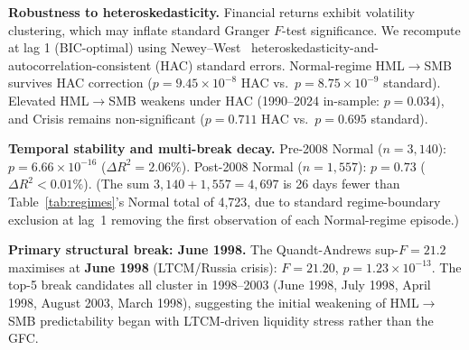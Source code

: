 \documentclass[sigconf,anonymous]{acmart}
\begin{document}
\textbf{Robustness to heteroskedasticity.}
Financial returns exhibit volatility clustering, which may inflate standard Granger
$F$-test significance. We recompute at lag 1 (BIC-optimal) using Newey--West~\cite{newey1987simple}
heteroskedasticity-and-autocorrelation-consistent (HAC) standard errors.
Normal-regime HML$\to$SMB survives HAC correction
($p = 9.45 \times 10^{-8}$ HAC vs.\ $p = 8.75 \times 10^{-9}$ standard).
Elevated HML$\to$SMB weakens under HAC (1990--2024 in-sample: $p = 0.034$), and Crisis remains
non-significant ($p = 0.711$ HAC vs.\ $p = 0.695$ standard).

\textbf{Temporal stability and multi-break decay.}
Pre-2008 Normal ($n = 3{,}140$): $p = 6.66\times10^{-16}$ ($\Delta R^2 = 2.06\%$).
Post-2008 Normal ($n = 1{,}557$): $p = 0.73$ ($\Delta R^2 < 0.01\%$).
(The sum $3{,}140 + 1{,}557 = 4{,}697$ is 26 days fewer than Table~\ref{tab:regimes}'s
Normal total of 4{,}723, due to standard regime-boundary exclusion at lag~1
removing the first observation of each Normal-regime episode.)

\textbf{Primary structural break: June 1998.}
The Quandt-Andrews sup-$F = 21.2$ maximises at \textbf{June 1998} (LTCM/Russia crisis):
$F = 21.20$, $p = 1.23 \times 10^{-13}$.
The top-5 break candidates all cluster in 1998--2003
(June 1998, July 1998, April 1998, August 2003, March 1998),
suggesting the initial weakening of HML$\to$SMB predictability began with
LTCM-driven liquidity stress rather than the GFC.
\end{document}
